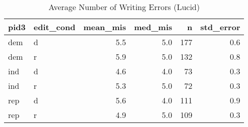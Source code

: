 \begin{table}[!htb]
\centering
\caption{Average Number of Writing Errors (Lucid)} 
\label{tab:error_sum_lucid}
\begin{tabular}{llrrrr}
  \hline
pid3 & edit\_cond & mean\_mis & med\_mis & n & std\_error \\ 
  \hline
dem & d & 5.5 & 5.0 & 177 & 0.6 \\ 
  dem & r & 5.9 & 5.0 & 132 & 0.8 \\ 
  ind & d & 4.6 & 4.0 & 73 & 0.3 \\ 
  ind & r & 5.3 & 5.0 & 72 & 0.3 \\ 
  rep & d & 5.6 & 4.0 & 111 & 0.9 \\ 
  rep & r & 4.9 & 5.0 & 109 & 0.3 \\ 
   \hline
\end{tabular}
\end{table}
